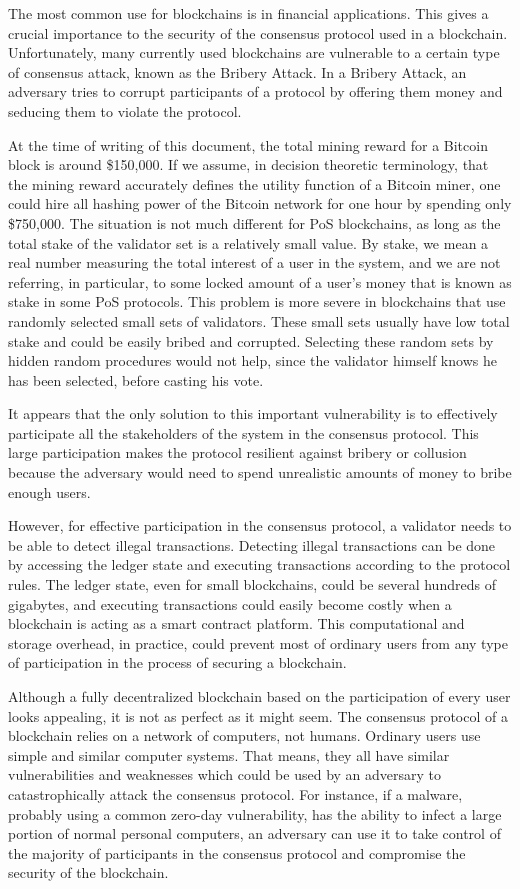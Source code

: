 The most common use for blockchains is in financial applications. This gives a crucial importance to the
security of the consensus protocol used in a blockchain. Unfortunately, many currently used blockchains are
vulnerable to a certain type of consensus attack, known as the Bribery Attack. In a Bribery Attack, an adversary
tries to corrupt participants of a protocol by offering them money and seducing them to violate the protocol.

At the time of writing of this document,
the total mining reward for a Bitcoin block is around \$150,000. If we assume, in decision theoretic terminology,
that the mining reward accurately defines the utility function of a Bitcoin miner, one could hire all hashing power
of the Bitcoin network for one hour by
spending only \$750,000. The situation is not much different for PoS blockchains, as long as the total
stake of the validator set is a relatively small value. By
stake, we mean a real number measuring the total interest of a user in the system, and we are not referring, in
particular, to some locked amount of a user's money that is known as stake in some PoS protocols.
This problem is more severe in blockchains that use randomly selected small sets of validators. These small sets
usually have low total stake and could be easily bribed and corrupted. Selecting these random sets
by hidden random procedures would not help, since the validator himself knows he has been selected, before casting
his vote.

It appears that the only solution to this important vulnerability is to effectively participate all the stakeholders
of the system in the consensus protocol. This large participation makes the protocol resilient against bribery or
collusion because the adversary would need to spend unrealistic amounts of money to bribe enough users.

However, for effective participation in the consensus protocol, a validator needs to be able to detect
illegal transactions. Detecting illegal transactions can be done by accessing the ledger
state and executing transactions according to the protocol rules. The
ledger state, even for small blockchains, could be several
hundreds of gigabytes, and executing transactions could easily become costly when a blockchain is acting as a
smart contract platform. This computational and storage overhead, in practice, could prevent most of
ordinary users from any type of participation in the process of securing a blockchain.

Although a fully decentralized blockchain based on the participation of every user looks appealing, it is not as perfect
as it might seem. The consensus protocol of a blockchain relies on a network of computers, not humans. Ordinary users
use simple and similar computer systems. That means, they all have similar vulnerabilities and weaknesses which could be
used by an adversary to catastrophically attack the consensus protocol. For instance, if a malware, probably using a
common zero-day
vulnerability, has the ability to infect a large portion of normal personal computers, an adversary can use it to
take control of the majority of participants in the consensus protocol and compromise the security of the
blockchain.

